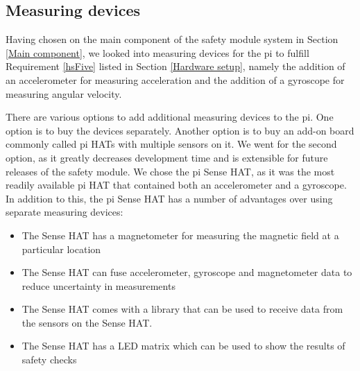 \documentclass[12pt]{scrreprt}
\begin{document}
\subsection{Measuring devices}
Having chosen on the main component of the safety module system in Section \ref{Main component}, we looked into measuring devices for the \gls{pi} to fulfill Requirement \ref{hsFive} listed in Section \ref{Hardware setup}, namely the addition of an accelerometer for measuring acceleration and the addition of a gyroscope for measuring angular velocity.
\par
There are various options to add additional measuring devices to the \gls{pi}. One option is to buy the devices separately. Another option is to buy an add-on board commonly called \gls{pi} HATs with multiple sensors on it. We went for the second option, as it greatly decreases development time and is extensible for future releases of the safety module. We chose the \gls{pi} Sense HAT, as it was the most readily available \gls{pi} HAT that contained both an accelerometer and a gyroscope. In addition to this, the \gls{pi} Sense HAT has a number of advantages over using separate measuring devices:

\begin{itemize}
    \item The Sense HAT has a magnetometer for measuring the magnetic field at a particular location
    \item The Sense HAT can fuse accelerometer, gyroscope and magnetometer data to reduce uncertainty in measurements
    \item The Sense HAT comes with a library that can be used to receive data from the sensors on the Sense HAT.
    \item The Sense HAT has a LED matrix which can be used to show the results of safety checks
\end{itemize}
\end{document}
